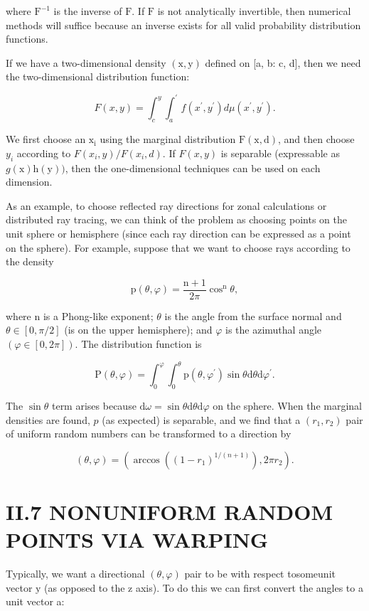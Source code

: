 \begin{CJK}{UTF8}{gbsn}
where $\mathrm{F}^{-1}$ is the inverse of $\mathrm{F}$. If $\mathrm{F}$ is not analytically invertible, then numerical methods will suffice because an inverse exists for all valid probability distribution functions.

If we have a two-dimensional density $(\mathrm{x}, \mathrm{y})$ defined on [a, b: c, d], then we need the two-dimensional distribution function:

$$
F(x, y)=\int_{c}^{y} \int_{a}^{\prime} f\left(x^{\prime}, y^{\prime}\right) d \mu\left(x^{\prime}, y^{\prime}\right) .
$$

We first choose an $\mathrm{x}_{\mathrm{i}}$ using the marginal distribution $\mathrm{F}(\mathrm{x}, \mathrm{d})$, and then choose $y_{i}$ according to $F\left(x_{i}, y\right) / F\left(x_{i}, d\right)$. If $F(x, y)$ is separable (expressable as $g(\mathrm{x}) \mathrm{h}(\mathrm{y}))$, then the one-dimensional techniques can be used on each dimension.

As an example, to choose reflected ray directions for zonal calculations or distributed ray tracing, we can think of the problem as choosing points on the unit sphere or hemisphere (since each ray direction can be expressed as a point on the sphere). For example, suppose that we want to choose rays according to the density

$$
\mathrm{p}(\theta, \varphi)=\frac{\mathrm{n}+1}{2 \pi} \cos ^{\mathrm{n}} \theta,
$$

where $\mathrm{n}$ is a Phong-like exponent; $\theta$ is the angle from the surface normal and $\theta \in[0, \pi / 2]$ (is on the upper hemisphere); and $\varphi$ is the azimuthal angle $(\varphi \in[0,2 \pi])$. The distribution function is

$$
\mathrm{P}(\theta, \varphi)=\int_{0}^{\varphi} \int_{0}^{\theta} \mathrm{p}\left(\theta, \varphi^{\prime}\right) \sin \theta \mathrm{d} \theta \mathrm{d} \varphi^{\prime} .
$$

The $\sin \theta$ term arises because $\mathrm{d} \omega=\sin \theta \mathrm{d} \theta \mathrm{d} \varphi$ on the sphere. When the marginal densities are found, $p$ (as expected) is separable, and we find that a $\left(r_{1}, r_{2}\right)$ pair of uniform random numbers can be transformed to a direction by

$$
(\theta, \varphi)=\left(\arccos \left(\left(1-r_{1}\right)^{1 /(n+1)}\right), 2 \pi r_{2}\right) .
$$

\section{II.7 NONUNIFORM RANDOM POINTS VIA WARPING}
Typically, we want a directional $(\theta, \varphi)$ pair to be with respect tosomeunit vector $\mathrm{y}$ (as opposed to the $\mathrm{z}$ axis). To do this we can first convert the angles to a unit vector a:


\end{CJK}
